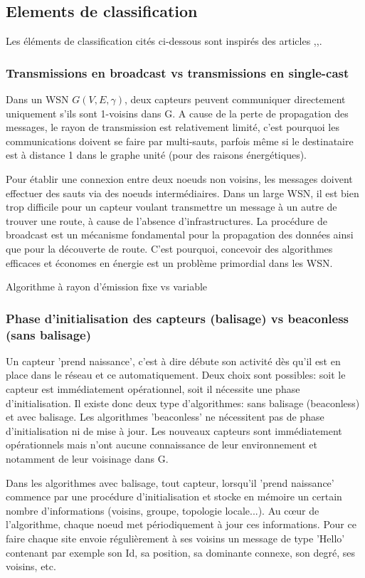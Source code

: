 \subsection{Elements de classification}
Les éléments de classification cités ci-dessous sont inspirés des articles \cite{stojmenovic2004},\cite{ingelrest2005},\cite{wu2003}.


\subsubsection{Transmissions en broadcast vs transmissions en single-cast}
Dans un WSN $G(V,E,\gamma)$, deux capteurs peuvent communiquer directement uniquement s'ils sont 1-voisins dans G. A cause de la perte de propagation des messages, le rayon de transmission est relativement limité, c'est pourquoi les communications doivent se faire par multi-sauts, parfois même si le destinataire est à distance 1 dans le graphe unité (pour des raisons énergétiques).

Pour établir une connexion entre deux noeuds non voisins, les messages doivent effectuer des sauts via des noeuds intermédiaires. Dans un large WSN, il est bien trop difficile pour un capteur voulant
transmettre un message à un autre de trouver une route, à cause de l'absence d'infrastructures. 
La procédure de broadcast est un mécanisme fondamental pour la propagation des données ainsi que pour la découverte de route. C'est pourquoi, concevoir des algorithmes efficaces et économes en énergie est un problème primordial dans les WSN. 

Algorithme à rayon d'émission fixe vs variable


\subsubsection{Phase d'initialisation des capteurs (balisage) vs beaconless (sans balisage)}
Un capteur 'prend naissance', c'est à dire débute son activité dès qu'il est en place dans le réseau et ce automatiquement. Deux choix sont possibles: soit le capteur est immédiatement opérationnel, soit il nécessite une phase d'initialisation. Il existe donc deux type d'algorithmes: sans balisage (beaconless) et avec balisage. Les algorithmes 'beaconless' ne nécessitent pas de phase d'initialisation ni de mise à jour. Les nouveaux capteurs sont immédiatement opérationnels mais n'ont aucune connaissance de leur environnement et notamment de leur voisinage dans G. 

Dans les algorithmes avec balisage, tout capteur, lorsqu'il 'prend naissance' commence par une procédure d'initialisation et stocke en mémoire un certain nombre d'informations (voisins, groupe, topologie locale...). Au cœur de l'algorithme, chaque noeud met périodiquement à jour ces informations. Pour ce faire chaque site envoie régulièrement à ses voisins un message de type
'Hello' contenant par exemple son Id, sa position, sa dominante connexe, son degré, ses voisins, etc.

